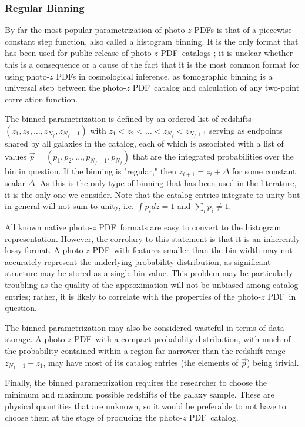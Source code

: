 \documentclass[\docopts]{\docclass}
\newcommand{\pz}{photo-$z$ PDF}
\begin{document}
\subsubsection{Regular Binning}
\label{sec:bins}

By far the most popular parametrization of \pz s is that of a piecewise 
constant step function, also called a histogram binning.  It is the only format 
that has been used for public release of \pz\ catalogs 
\citep{tanaka_photometric_2017, sheldon_photometric_2012}; it is unclear 
whether this is a consequence or a cause of the fact that it is the most common 
format for using \pz s in cosmological inference, as tomographic binning is a 
universal step between the \pz\ catalog and calculation of any two-point 
correlation function.

The binned parametrization is defined by an ordered list of redshifts $(z_{1}, 
z_{2}, \dots, z_{N_{f}}, z_{N_{f}+1})$ with $z_{1} < z_{2} < \dots < z_{N_{f}} 
< z_{N_{f}+1}$ serving as endpoints shared by all galaxies in the catalog, each 
of which is associated with a list of values $\vec{p} = (p_{1}, p_{2}, \dots, 
p_{N_{f}-1}, p_{N_{f}})$ that are the integrated probabilities over the bin in 
question.  If the binning is "regular," then $z_{i+1}=z_{i}+\Delta$ for some 
constant scalar $\Delta$.  As this is the only type of binning that has been 
used in the literature, it is the only one we consider.  Note that the catalog 
entries integrate to unity but in general will not sum to unity, i.e. $\int 
p_{i} dz = 1$ and $\sum_{i}p_{i}\neq1$.

All known native \pz\ formats are easy to convert to the histogram 
representation.  However, the corrolary to this statement is that it is an 
inherently lossy format.  A \pz\ with features smaller than the bin width may 
not accurately represent the underlying probability distribution, as 
significant structure may be stored as a single bin value.  This problem may be 
particularly troubling as the quality of the approximation will not be unbiased 
among catalog entries; rather, it is likely to correlate with the properties of 
the \pz\ in question.

The binned parametrization may also be considered wasteful in terms of data 
storage.  A \pz\ with a compact probability distribution, with much of the 
probability contained within a region far narrower than the redshift range 
$z_{N_{f}+1} - z_{1}$, may have most of its catalog entries (the elements of 
$\vec{p}$) being trivial.

Finally, the binned parametrization requires the researcher to choose the 
minimum and maximum possible redshifts of the galaxy sample.  These are 
physical quantities that are unknown, so it would be preferable to not have to 
choose them at the stage of producing the \pz\ catalog.
\end{document}
